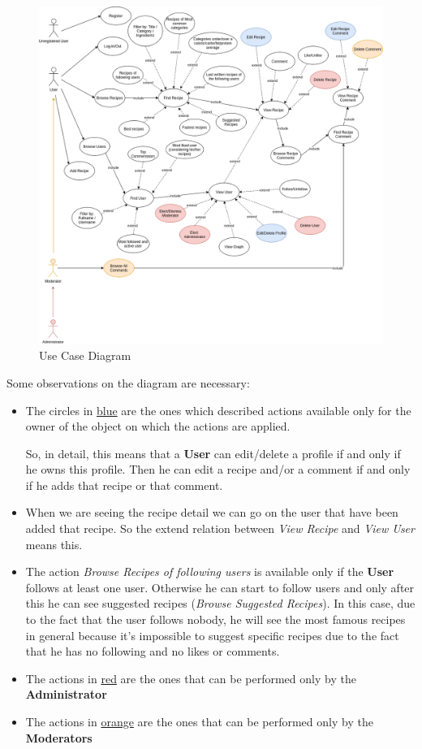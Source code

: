 \documentclass[a4paper]{report}
\begin{document}
\begin{figure}[htpb]
	\centering
	\includegraphics[scale=0.4]{img/UseCaseDiagram.png}
	\caption{Use Case Diagram}
\end{figure}

\noindent Some observations on the diagram are necessary:
\begin{itemize}
	\item The circles in \underline{blue} are the ones which described actions available only for the owner of the object on which the actions are applied.
	
	\noindent So, in detail, this means that a \textbf{User} can edit/delete a profile if and only if he owns this profile. Then he can edit a recipe and/or a comment if and only if he adds that recipe or that comment.
	
	\item When we are seeing the recipe detail we can go on the user that have been added that recipe. So the extend relation between \emph{View Recipe} and \emph{View User} means this.
	
	\item The action \emph{Browse Recipes of following users} is available only if the \textbf{User} follows at least one user. Otherwise he can start to follow users and only after this he can see suggested recipes (\emph{Browse Suggested Recipes}). In this case, due to the fact that the user follows nobody, he will see the most famous recipes in general because it's impossible to suggest specific recipes due to the fact that he has no following and no likes or comments. 
	
	\item The actions in \underline{red} are the ones that can be performed only by the \textbf{Administrator}
	
	\item The actions in \underline{orange} are the ones that can be performed only by the \textbf{Moderators}
\end{itemize}
\end{document}
